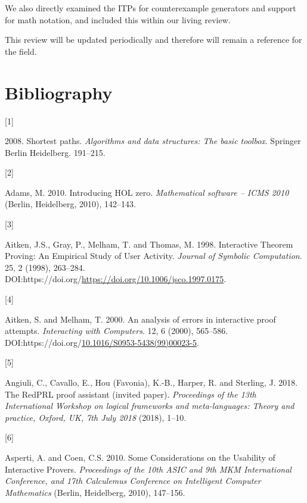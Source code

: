 \documentclass[
]{article}
\newlength{\cslhangindent}
\newlength{\csllabelwidth}
\newlength{\cslentryspacingunit} %
\newenvironment{CSLReferences}[2] %
 {%
  \setlength{\parindent}{0pt}
  \ifodd #1
  \let\oldpar\par
  \def\par{\hangindent=\cslhangindent\oldpar}
  \fi
  \setlength{\parskip}{#2\cslentryspacingunit}
 }%
 {}
\newcommand{\CSLLeftMargin}[1]{\parbox[t]{\csllabelwidth}{#1}}
\newcommand{\CSLRightInline}[1]{\parbox[t]{\linewidth - \csllabelwidth}{#1}\break}
\begin{document}
We also directly examined the ITPs for counterexample generators and
support for math notation, and included this within our living review.

This review will be updated periodically and therefore will remain a
reference for the field.

\hypertarget{bibliography}{%
\section*{Bibliography}\label{bibliography}}

\hypertarget{refs}{}
\begin{CSLReferences}{0}{0}
\leavevmode{}%
\CSLLeftMargin{{[}1{]} }
\CSLRightInline{2008. Shortest paths. \emph{Algorithms and data
structures: The basic toolbox}. Springer Berlin Heidelberg. 191--215.}

\leavevmode{}%
\CSLLeftMargin{{[}2{]} }
\CSLRightInline{Adams, M. 2010. Introducing HOL zero. \emph{Mathematical
software -- ICMS 2010} (Berlin, Heidelberg, 2010), 142--143.}

\leavevmode{}%
\CSLLeftMargin{{[}3{]} }
\CSLRightInline{Aitken, J.S., Gray, P., Melham, T. and Thomas, M. 1998.
Interactive {Theorem} {Proving}: {An} {Empirical} {Study} of {User}
{Activity}. \emph{Journal of Symbolic Computation}. 25, 2 (1998),
263--284.
DOI:https://doi.org/\url{https://doi.org/10.1006/jsco.1997.0175}.}

\leavevmode{}%
\CSLLeftMargin{{[}4{]} }
\CSLRightInline{Aitken, S. and Melham, T. 2000. An analysis of errors in
interactive proof attempts. \emph{Interacting with Computers}. 12, 6
(2000), 565--586.
DOI:https://doi.org/\href{https://doi.org/10.1016/S0953-5438(99)00023-5}{10.1016/S0953-5438(99)00023-5}.}

\leavevmode{}%
\CSLLeftMargin{{[}5{]} }
\CSLRightInline{Angiuli, C., Cavallo, E., Hou (Favonia), K.-B., Harper,
R. and Sterling, J. 2018. The RedPRL proof assistant (invited paper).
\emph{{Proceedings of the 13th International Workshop on} logical
frameworks and meta-languages: Theory and practice, {Oxford, UK, 7th
July 2018}} (2018), 1--10.}

\leavevmode{}%
\CSLLeftMargin{{[}6{]} }
\CSLRightInline{Asperti, A. and Coen, C.S. 2010. Some {Considerations}
on the {Usability} of {Interactive} {Provers}. \emph{Proceedings of the
10th {ASIC} and 9th {MKM} {International} {Conference}, and 17th
{Calculemus} {Conference} on {Intelligent} {Computer} {Mathematics}}
(Berlin, Heidelberg, 2010), 147--156.}


\end{CSLReferences}
\end{document}
